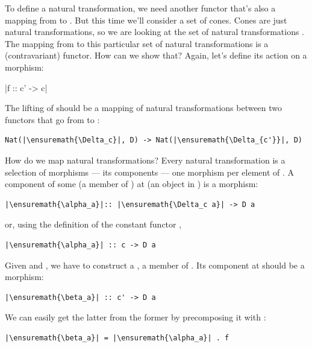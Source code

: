 To define a natural transformation, we need another functor that's also
a mapping from  to . But this time we'll consider a
set of cones. Cones are just natural transformations, so we are looking
at the set of natural transformations . The mapping
from  to this particular set of natural transformations is a
(contravariant) functor. How can we show that? Again, let's define its
action on a morphism:

|f :: c' -> c|

The lifting of  should be a mapping of natural transformations
between two functors that go from  to :

\begin{verbatim}
Nat(|\ensuremath{\Delta_c}|, D) -> Nat(|\ensuremath{\Delta_{c'}}|, D)
\end{verbatim}

How do we map natural transformations? Every natural transformation is a
selection of morphisms --- its components --- one morphism per element
of . A component of some \mathtext{\alpha} (a member of ) at
 (an object in ) is a morphism:

\begin{verbatim}
|\ensuremath{\alpha_a}|:: |\ensuremath{\Delta_c a}| -> D a
\end{verbatim}

or, using the definition of the constant functor \mathtext{\Delta},

\begin{verbatim}
|\ensuremath{\alpha_a}| :: c -> D a
\end{verbatim}

Given  and \mathtext{\alpha}, we have to construct a \mathtext{\beta}, a member of
. Its component at  should be a
morphism:

\begin{verbatim}
|\ensuremath{\beta_a}| :: c' -> D a
\end{verbatim}

We can easily get the latter from the former by precomposing it with
:

\begin{verbatim}
|\ensuremath{\beta_a}| = |\ensuremath{\alpha_a}| . f
\end{verbatim}


